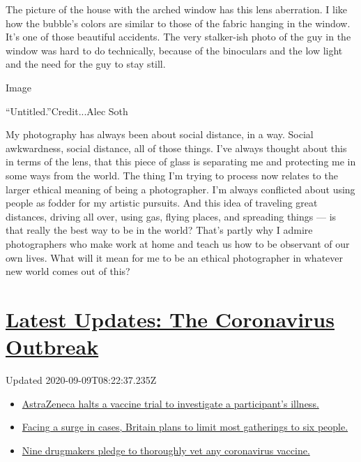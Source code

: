 The picture of the house with the arched window has this lens
aberration. I like how the bubble's colors are similar to those of the
fabric hanging in the window. It's one of those beautiful accidents. The
very stalker-ish photo of the guy in the window was hard to do
technically, because of the binoculars and the low light and the need
for the guy to stay still.

Image

``Untitled.''Credit...Alec Soth

My photography has always been about social distance, in a way. Social
awkwardness, social distance, all of those things. I've always thought
about this in terms of the lens, that this piece of glass is separating
me and protecting me in some ways from the world. The thing I'm trying
to process now relates to the larger ethical meaning of being a
photographer. I'm always conflicted about using people as fodder for my
artistic pursuits. And this idea of traveling great distances, driving
all over, using gas, flying places, and spreading things --- is that
really the best way to be in the world? That's partly why I admire
photographers who make work at home and teach us how to be observant of
our own lives. What will it mean for me to be an ethical photographer in
whatever new world comes out of this?

\hypertarget{latest-updates-the-coronavirus-outbreak}{%
\section{\texorpdfstring{\href{https://www.nytimes3xbfgragh.onion/2020/09/08/world/covid-19-coronavirus.html?action=click\&pgtype=Article\&state=default\&region=MAIN_CONTENT_1\&context=storylines_live_updates}{Latest
Updates: The Coronavirus
Outbreak}}{Latest Updates: The Coronavirus Outbreak}}\label{latest-updates-the-coronavirus-outbreak}}

Updated 2020-09-09T08:22:37.235Z

\begin{itemize}
\tightlist
\item
  \href{https://www.nytimes3xbfgragh.onion/2020/09/08/world/covid-19-coronavirus.html?action=click\&pgtype=Article\&state=default\&region=MAIN_CONTENT_1\&context=storylines_live_updates\#link-313b443d}{AstraZeneca
  halts a vaccine trial to investigate a participant's illness.}
\item
  \href{https://www.nytimes3xbfgragh.onion/2020/09/08/world/covid-19-coronavirus.html?action=click\&pgtype=Article\&state=default\&region=MAIN_CONTENT_1\&context=storylines_live_updates\#link-4438dd7}{Facing
  a surge in cases, Britain plans to limit most gatherings to six
  people.}
\item
  \href{https://www.nytimes3xbfgragh.onion/2020/09/08/world/covid-19-coronavirus.html?action=click\&pgtype=Article\&state=default\&region=MAIN_CONTENT_1\&context=storylines_live_updates\#link-679303d7}{Nine
  drugmakers pledge to thoroughly vet any coronavirus vaccine.}
\end{itemize}


